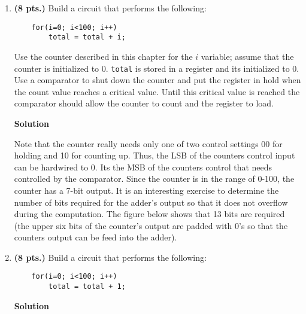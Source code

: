\begin{enumerate}
    \item \textbf{ (8 pts.)} Build a circuit that performs the following:
\begin{verbatim}
    for(i=0; i<100; i++)
        total = total + i;
\end{verbatim}
        Use the counter described in this chapter for the $i$ variable;
        assume that the counter is initialized to 0. \verb^total^ is stored
        in a register and its initialized to 0.  Use a comparator to shut
        down the counter and put the register in hold when the count value
        reaches a critical value. Until this critical value is
        reached the comparator should allow the counter to count and the
        register to load.

        \begin{onlysolution}  \textbf{Solution} \itshape{
                Note that the counter really needs only one of two control settings
                00 for holding and 10 for counting up.  Thus, the LSB of the counters
                control input can be hardwired to 0.  Its the MSB of the counters control
                that needs controlled by the comparator.  Since the counter is in the
                range of 0-100, the counter has a 7-bit output.  It is an interesting exercise to
                determine the number of bits required for the adder's output so that it
                does not overflow during the computation.  The figure below shows that
                13 bits are required (the upper six bits of the counter's output are padded
                with 0's so that the counters output can be feed into the adder).

                \begin{figure}[ht]
                \end{figure}
            }
        \end{onlysolution}

    \item\textbf{ (8 pts.)} Build a circuit that performs the following:
\begin{verbatim}
    for(i=0; i<100; i++)
        total = total + 1;
\end{verbatim}

        \begin{onlysolution}  \textbf{Solution} \itshape{
                \begin{figure}[ht]
                \end{figure}
            }
        \end{onlysolution}


\end{enumerate}
